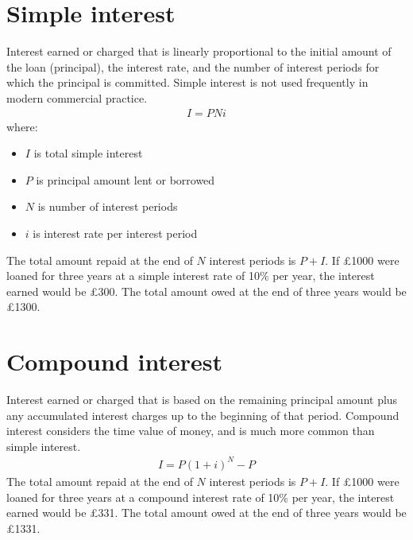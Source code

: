 \section{Simple interest}
Interest earned or charged that is linearly proportional to the initial amount of the loan (principal), the interest rate, and the number of interest periods for which the principal is committed. Simple interest is not used frequently in modern commercial practice.
\begin{gather}
  I = PNi
\end{gather}
where:
\begin{itemize}
  \item $I$ is total simple interest
  \item $P$ is principal amount lent or borrowed
  \item $N$ is number of interest periods
  \item $i$ is interest rate per interest period
\end{itemize}
The total amount repaid at the end of $N$ interest periods is $P+I$. If £1000 were loaned for three years at a simple interest rate of 10\% per year, the interest earned would be £300. The total amount owed at the end of three years would be £1300.
\section{Compound interest}
Interest earned or charged that is based on the remaining principal amount plus any accumulated interest charges up to the beginning of that period. Compound interest considers the time value of money, and is much more common than simple interest.
\begin{gather}
  I = P\left(1 + i\right)^N - P
\end{gather}
The total amount repaid at the end of $N$ interest periods is $P+I$. If £1000 were loaned for three years at a compound interest rate of 10\% per year, the interest earned would be £331. The total amount owed at the end of three years would be £1331.
